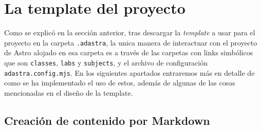 \section{La template del proyecto}

Como se explicó en la sección anterior, tras descargar la \textit{template} a usar para el proyecto en la carpeta \verb|.adastra|, la unica manera de interactuar con el proyecto de Astro alojado en esa carpeta es a través de las carpetas con links simbólicos que son \verb|classes|, \verb|labs| y \verb|subjects|, y el archivo de configuración \verb|adastra.config.mjs|. En los siguientes apartados entraremos más en detalle de como se ha implementado el uso de estos, además de algunas de las cosas mencionadas en el diseño de la template.

\subsection{Creación de contenido por Markdown}

